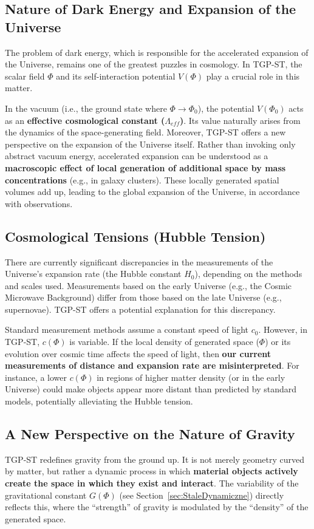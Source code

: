 \documentclass[11pt,a4paper]{article}
\begin{document}
\subsection{Nature of Dark Energy and Expansion of the Universe}
The problem of dark energy, which is responsible for the accelerated expansion of the Universe, remains one of the greatest puzzles in cosmology. In TGP-ST, the scalar field $\Phi$ and its self-interaction potential $V(\Phi)$ play a crucial role in this matter.

In the vacuum (i.e., the ground state where $\Phi \rightarrow \Phi_0$), the potential $V(\Phi_0)$ acts as an \textbf{effective cosmological constant ($\Lambda_{eff}$)}. Its value naturally arises from the dynamics of the space-generating field. Moreover, TGP-ST offers a new perspective on the expansion of the Universe itself. Rather than invoking only abstract vacuum energy, accelerated expansion can be understood as a \textbf{macroscopic effect of local generation of additional space by mass concentrations} (e.g., in galaxy clusters). These locally generated spatial volumes add up, leading to the global expansion of the Universe, in accordance with observations.

\subsection{Cosmological Tensions (Hubble Tension)}
There are currently significant discrepancies in the measurements of the Universe’s expansion rate (the Hubble constant $H_0$), depending on the methods and scales used. Measurements based on the early Universe (e.g., the Cosmic Microwave Background) differ from those based on the late Universe (e.g., supernovae). TGP-ST offers a potential explanation for this discrepancy.

Standard measurement methods assume a constant speed of light $c_0$. However, in TGP-ST, $c(\Phi)$ is variable. If the local density of generated space ($\Phi$) or its evolution over cosmic time affects the speed of light, then \textbf{our current measurements of distance and expansion rate are misinterpreted}. For instance, a lower $c(\Phi)$ in regions of higher matter density (or in the early Universe) could make objects appear more distant than predicted by standard models, potentially alleviating the Hubble tension.

\subsection{A New Perspective on the Nature of Gravity}
TGP-ST redefines gravity from the ground up. It is not merely geometry curved by matter, but rather a dynamic process in which \textbf{material objects actively create the space in which they exist and interact}. The variability of the gravitational constant $G(\Phi)$ (see Section~\ref{sec:StaleDynamiczne}) directly reflects this, where the “strength” of gravity is modulated by the “density” of the generated space.
\end{document}
